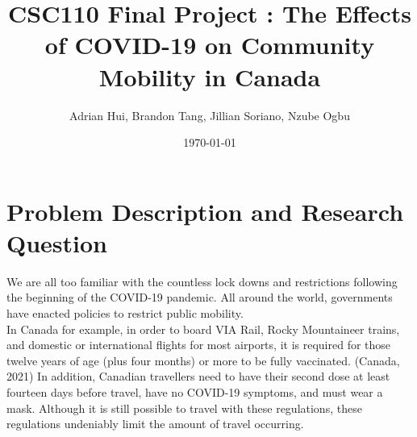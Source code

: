 \documentclass[fontsize=11pt]{article}
\title{CSC110 Final Project : The Effects of COVID-19 on Community Mobility in Canada}
\author{Adrian Hui, Brandon Tang, Jillian Soriano, Nzube Ogbu}
\date{\today}
\begin{document}
    \maketitle



    \section*{Problem Description and Research Question}

    \hspace{\parindent} We are all too familiar with the countless lock downs and restrictions following the beginning of the COVID-19 pandemic. All around the world, governments have enacted policies to restrict public mobility. \\
    In Canada for example, in order to board VIA Rail, Rocky Mountaineer trains, and domestic or international flights for most airports, it is required for those twelve years of age (plus four months) or more to be fully vaccinated. (Canada, 2021) In addition, Canadian travellers need to have their second dose at least fourteen days before travel, have no COVID-19 symptoms, and must wear a mask. Although it is still possible to travel with these regulations, these regulations undeniably limit the amount of travel occurring.\\\\
\end{document}
